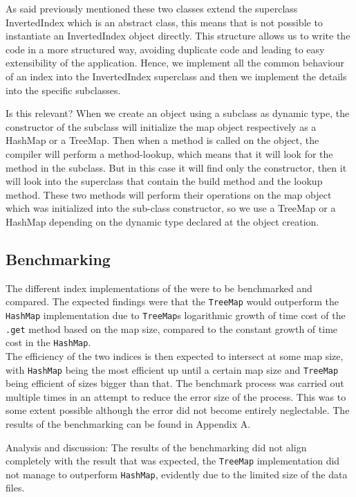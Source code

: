 As said previously mentioned these two classes extend the superclass InvertedIndex which is an abstract class, this means that is not possible to instantiate an InvertedIndex object directly. This structure allows us to write the code in a more structured way, avoiding duplicate code and leading to easy extensibility of the application. Hence, we implement all the common behaviour of an index into the InvertedIndex superclass and then we implement the details into the specific subclasses.

Is this relevant?
When we create an object using a subclass as dynamic type, the constructor of the subclass will initialize the map object respectively as a HashMap or a TreeMap. Then when a method is called on the object, the compiler will perform a method-lookup, which means that it will look for the method in the subclass. But in this case it will find only the constructor, then it will look into the superclass that contain the build method and the lookup method. These two methods will perform their operations on the map object which was initialized into the sub-class constructor, so we use a TreeMap or a HashMap depending on the dynamic type declared at the object creation.


\subsection{Benchmarking}
The different index implementations of the were to be benchmarked and compared. The expected 	findings were that the \verb+TreeMap+ would outperform the \verb+HashMap+ implementation due to \verb+TreeMap+s logarithmic growth of time cost of the \verb+.get+ method based on the map size, compared to the constant growth of time cost in the \verb+HashMap+. \\
The efficiency of the two indices is then expected to intersect at some map size, with \verb+HashMap+ being the most efficient up until a certain map size and \verb+TreeMap+ being efficient of sizes bigger than that.
The benchmark process was carried out multiple times in an attempt to reduce the error size of the process. This was to some extent possible although the error did not become entirely neglectable.
The results of the benchmarking can be found in Appendix A.

Analysis and discussion:
The results of the benchmarking did not align completely with the result that was expected, the \verb+TreeMap+ implementation did not manage to outperform \verb+HashMap+, evidently due to the limited size of the data files. 


